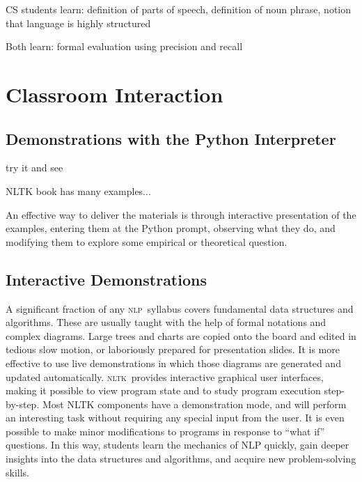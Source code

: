 \documentclass[11pt]{article}
\newcommand{\NLP}{\textsc{nlp}}
\newcommand{\NLTK}{\textsc{nltk}}
\begin{document}
CS students learn: definition of parts of speech, definition of noun phrase, notion that
language is highly structured

Both learn: formal evaluation using precision and recall


\section{Classroom Interaction}
\label{sec:classroom-interaction}

\subsection{Demonstrations with the Python Interpreter}

try it and see

NLTK book has many examples...

An effective way to deliver the materials is through interactive
presentation of the examples, entering them at the Python prompt,
observing what they do, and modifying them to explore some empirical
or theoretical question.


\subsection{Interactive Demonstrations}

A significant fraction of any \NLP\ syllabus covers fundamental data
structures and algorithms. These are usually taught with the help of
formal notations and complex diagrams. Large trees and charts are
copied onto the board and edited in tedious slow motion, or
laboriously prepared for presentation slides. It is more effective to
use live demonstrations in which those diagrams are generated and
updated automatically. \NLTK\ provides interactive graphical user
interfaces, making it possible to view program state and to study
program execution step-by-step. Most NLTK components have a
demonstration mode, and will perform an interesting task without
requiring any special input from the user. It is even possible to make
minor modifications to programs in response to ``what if'' questions. In
this way, students learn the mechanics of NLP quickly, gain deeper
insights into the data structures and algorithms, and acquire new
problem-solving skills.
\end{document}

